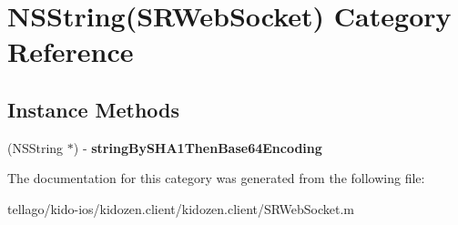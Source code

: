 \hypertarget{category_n_s_string_07_s_r_web_socket_08}{\section{N\-S\-String(S\-R\-Web\-Socket) Category Reference}
\label{category_n_s_string_07_s_r_web_socket_08}
}
\subsection*{Instance Methods}
\begin{DoxyCompactItemize}
\item 
\hypertarget{category_n_s_string_07_s_r_web_socket_08_a68f633a1ae85c7178bbcab446da63876}{(N\-S\-String $\ast$) -\/ {\bfseries string\-By\-S\-H\-A1\-Then\-Base64\-Encoding}}\label{category_n_s_string_07_s_r_web_socket_08_a68f633a1ae85c7178bbcab446da63876}

\end{DoxyCompactItemize}


The documentation for this category was generated from the following file\-:\begin{DoxyCompactItemize}
\item 
tellago/kido-\/ios/kidozen.\-client/kidozen.\-client/S\-R\-Web\-Socket.\-m\end{DoxyCompactItemize}
